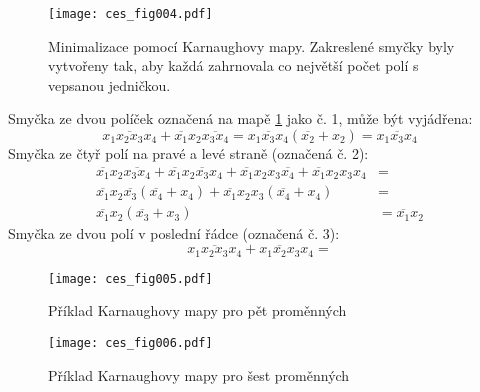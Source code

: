       \begin{figure}[ht!] %
        \centering
        \texttt{[image: ces\_fig004.pdf]}
        \caption{Minimalizace pomocí Karnaughovy mapy. Zakreslené smyčky byly vytvořeny tak, aby 
                 každá zahrnovala co největší počet polí s vepsanou 
                 jedničkou.}
        \label{ces:fig004}
      \end{figure}     
     Smyčka ze dvou políček označená na mapě \ref{ces:fig004} jako č. 1, může být vyjádřena:  
     \begin{equation}
       \overline{x_1x_2x_3x_4} + \overline{x_1}x_2\overline{x_3x_4} = \overline{x_1x_3x_4}(\overline{x_2} + x_2) =
       \overline{x_1x_3x_4}
     \end{equation}
     Smyčka ze čtyř polí na pravé a levé straně (označená č. 2):
     \begin{align}
       \overline{x_1}x_2\overline{x_3x_4} + 
       \overline{x_1}x_2\overline{x_3}x_4 + 
       \overline{x_1}x_2x_3\overline{x_4} +
       \overline{x_1}x_2x_3x_4                                &=               \\ \nonumber
       \overline{x_1}x_2\overline{x_3}(\overline{x_4}+x_4) +  
       \overline{x_1}x_2x_3(\overline{x_4}+x_4)               &=               \\ \nonumber
       \overline{x_1}x_2(\overline{x_3}+x_3)                  &= 
       \overline{x_1}x_2 
     \end{align}
     Smyčka ze dvou polí v poslední řádce (označená č. 3):
     \begin{equation}
       x_1\overline{x_2x_3}x_4 + x_1\overline{x_2}x_3x_4 = 
     \end{equation}

      \begin{figure}[ht!] %
        \centering
        \texttt{[image: ces\_fig005.pdf]}
        \caption{Příklad Karnaughovy mapy pro pět proměnných}
        \label{ces:fig005}
      \end{figure}

      \begin{figure}[ht!] %
        \centering
        \texttt{[image: ces\_fig006.pdf]}
        \caption{Příklad Karnaughovy mapy pro šest proměnných}
        \label{ces:fig006}
      \end{figure}

\printbibliography[title={Seznam literatury}, heading=subbibliography]

